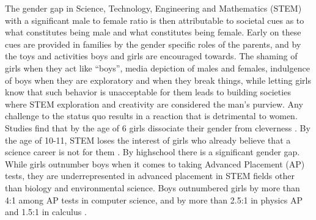 \documentclass[utf8]{frontiersSCNS} %
\begin{document}
 The gender gap in Science, Technology, Engineering and Mathematics (STEM) with a significant male to female ratio is then attributable to societal cues as to what constitutes being male and what constitutes being female. Early on these cues are provided in families by the gender specific roles of the parents, and by the toys and activities boys and girls are encouraged towards. The shaming of girls when they act like “boys”, media depiction of males and females, indulgence of boys when they are exploratory and when they break things, while letting girls know that such behavior is unacceptable for them leads to building societies where STEM exploration and creativity are considered the man’s purview. Any challenge to the status quo results in a reaction that is detrimental to women. Studies find that by the age of 6 girls dissociate their gender from cleverness \citep{bian2017gender,bian2018messages}. By the age of 10-11, STEM loses the interest of girls who already believe that a science career is not for them \citep{archer2012balancing}. By highschool there is a significant gender gap. While girls outnumber boys when it comes to taking Advanced Placement (AP) tests, they are underrepresented in advanced placement in STEM fields other than biology and environmental science. Boys outnumbered girls by more than 4:1 among AP tests in computer science, and by more than 2.5:1 in physics AP and 1.5:1 in calculus \citep{ericson2013detailed}.




\end{document}
